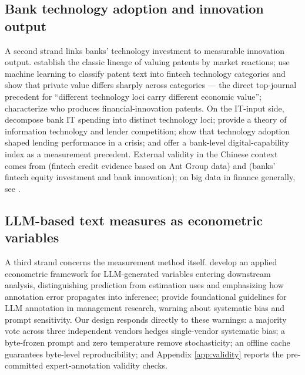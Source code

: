 \subsection{Bank technology adoption and innovation output}

A second strand links banks' technology investment to measurable innovation output.
\textcite{kogan2017technological} establish the classic lineage of valuing patents by
market reactions; \textcite{chen2019fintechvalue} use machine learning to classify
patent text into fintech technology categories and show that private value differs
sharply across categories — the direct top-journal precedent for ``different technology
loci carry different economic value''; \textcite{lerner2024finpatents} characterize who
produces financial-innovation patents. On the IT-input side, \textcite{he2026lendingit}
decompose bank IT spending into distinct technology loci; \textcite{vivesye2025itcompetition}
provide a theory of information technology and lender competition;
\textcite{pierri2022techbanking} show that technology adoption shaped lending
performance in a crisis; and \textcite{kwan2024digitalcapability} offer a bank-level
digital-capability index as a measurement precedent. External validity in the Chinese
context comes from \textcite{hau2024fintechcredit} (fintech credit evidence based on Ant
Group data) and \textcite{alfhaili2026fintechequity} (banks' fintech equity investment
and bank innovation); on big data in finance generally, see
\parencite{goldstein2021bigdata,goldstein2019fintech}.

\subsection{LLM-based text measures as econometric variables}

A third strand concerns the measurement method itself. \textcite{ludwig2025llmecon}
develop an applied econometric framework for LLM-generated variables entering downstream
analysis, distinguishing prediction from estimation uses and emphasizing how annotation
error propagates into inference; \textcite{carlson2026llmannotation} provide
foundational guidelines for LLM annotation in management research, warning about
systematic bias and prompt sensitivity. Our design responds directly to these warnings:
a majority vote across three independent vendors hedges single-vendor systematic bias;
a byte-frozen prompt and zero temperature remove stochasticity; an offline cache
guarantees byte-level reproducibility; and Appendix \ref{app:validity} reports the
pre-committed expert-annotation validity checks.


